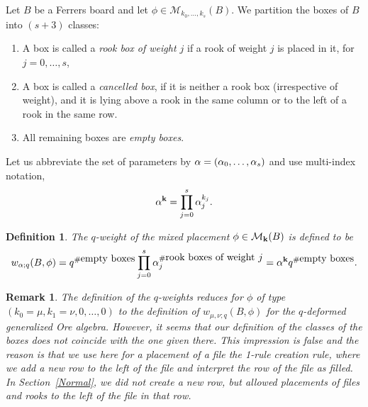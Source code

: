 \documentclass[10pt]{amsart}
\newtheorem{remark}[theorem]{Remark}%
\newtheorem{definition}[theorem]{Definition}
\begin{document}
Let $B$ be a Ferrers board and let $\phi \in \mathcal{M}_{k_0,\ldots,k_s}(B)$. We partition the boxes of $B$ into $(s+3)$ classes:
\begin{enumerate}
\item A box is called a {\em rook box of weight $j$} if a rook of weight $j$ is placed in it, for $j=0,\ldots,s$,
\item A box is called a {\em cancelled box}, if it is neither a rook box (irrespective of weight), and it is lying above a rook in the same column or to the left of a rook in the same row.
\item All remaining boxes are {\em empty boxes}. 
\end{enumerate}
Let us abbreviate the set of parameters by ${\bf \alpha}=(\alpha_0,\dots,\alpha_s)$ and use multi-index notation,
$$
{\bf  \alpha}^{{\bf k}}=  \prod_{j=0}^s \alpha_j^{k_j}.
 $$
\begin{definition}
The {\em $q$-weight of the mixed placement} $\phi \in \mathcal{M}_{{\bf k}}(B)$ is defined to be 
\begin{equation}
w_{{\bf \alpha};q}(B,\phi)=q^{\# \mbox{empty boxes}} \prod_{j=0}^s \alpha_j^{\# \mbox{rook boxes of weight $j$}}= {\bf  \alpha}^{{\bf k}} q^{\# \mbox{empty boxes}}.
\end{equation}
\end{definition}
\begin{remark}
The definition of the $q$-weights reduces for $\phi$ of type $(k_0=\mu,k_1=\nu,0,\ldots,0)$ to the definition of $w_{\mu,\nu;q}(B,\phi)$ for the $q$-deformed generalized Ore algebra. However, it seems that our definition of the classes of the boxes does not coincide with the one given there. This impression is false and the reason is that we use here for a placement of a file the 1-rule creation rule, where we add a new row to the left of the file and interpret the row of the file as filled. In Section~\ref{Normal}, we did not create a new row, but allowed placements of files and rooks to the left of the file in that row.
\end{remark}
\end{document}
